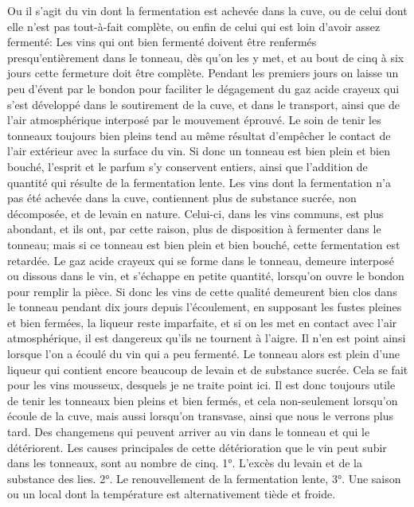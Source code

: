 Ou il s'agit du vin dont la fermentation est achevée dans la cuve, ou de celui dont elle n'est pas tout-à-fait complète, ou enfin de celui qui est loin d'avoir assez fermenté:
Les vins qui ont bien fermenté doivent être renfermés presqu'entièrement dans le tonneau, dès qu'on les y met, et au bout\setcounter{page}{322} de cinq à six jours cette fermeture doit être complète. Pendant les premiers jours on laisse un peu d'évent par le bondon pour faciliter le dégagement du gaz acide crayeux qui s'est développé dans le soutirement de la cuve, et dans le transport, ainsi que de l'air atmosphérique interposé par le mouvement éprouvé. Le soin de tenir les tonneaux toujours bien pleins tend au même résultat d'empêcher le contact de l'air extérieur avec la surface du vin. Si donc un tonneau est bien plein et bien bouché, l'esprit et le parfum s'y conservent entiers, ainsi que l'addition de quantité qui résulte de la fermentation lente.
Les vins dont la fermentation n'a pas été achevée dans la cuve, contiennent plus de substance sucrée, non décomposée, et de levain en nature. Celui-ci, dans les vins communs, est plus abondant, et ils ont, par cette raison, plus de disposition à fermenter dans le tonneau; mais si ce tonneau est bien plein et bien bouché, cette fermentation est retardée. Le gaz acide crayeux qui se forme dans le tonneau, demeure interposé ou dissous dans le vin, et s'échappe en petite quantité, lorsqu'on ouvre le bondon pour remplir la pièce.
Si donc les vins de cette qualité demeurent bien clos dans le tonneau pendant dix\setcounter{page}{323} jours depuis l'écoulement, en supposant les fustes pleines et bien fermées, la liqueur reste imparfaite, et si on les met en contact avec l'air atmosphérique, il est dangereux qu'ils ne tournent à l'aigre.
Il n'en est point ainsi lorsque l'on a écoulé du vin qui a peu fermenté. Le tonneau alors est plein d'une liqueur qui contient encore beaucoup de levain et de substance sucrée. Cela se fait pour les vins mousseux, desquels je ne traite point ici.
Il est donc toujours utile de tenir les tonneaux bien pleins et bien fermés, et cela non-seulement lorsqu'on écoule de la cuve, mais aussi lorsqu'on transvase, ainsi que nous le verrons plus tard.
Des changemens qui peuvent arriver au vin dans le tonneau et qui le détériorent.
Les causes principales de cette détérioration que le vin peut subir dans les tonneaux, sont au nombre de cinq.
1°. L'excès du levain et de la substance des lies.
2°. Le renouvellement de la fermentation lente,
3°. Une saison ou un local dont la température est alternativement tiède et froide.

